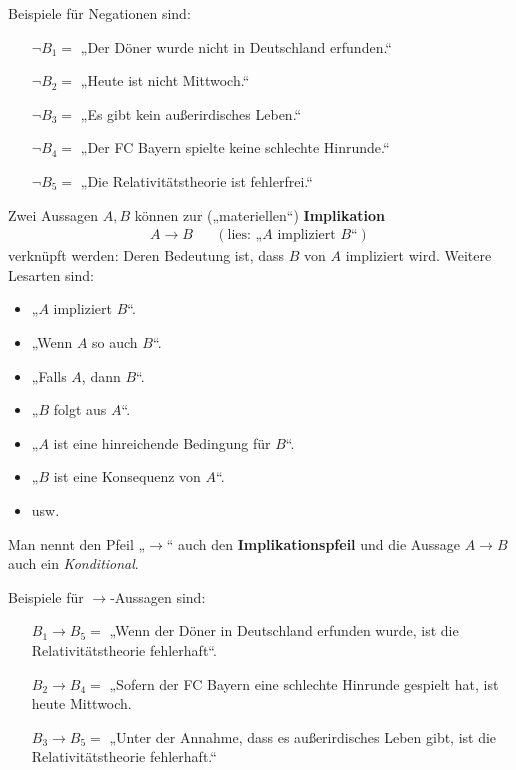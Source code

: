 \begin{bsp}    
    Beispiele für Negationen sind:
    \begin{itemize}[labelindent=1.5em, leftmargin=!, labelwidth=]
        \item[$\neg B_1 =$] „Der Döner wurde nicht in Deutschland erfunden.“
        \item[$\neg B_2 =$] „Heute ist nicht Mittwoch.“
        \item[$\neg B_3 =$] „Es gibt kein außerirdisches Leben.“
        \item[$\neg B_4 =$] „Der FC Bayern spielte keine schlechte Hinrunde.“
        \item[$\neg B_5 =$] „Die Relativitätstheorie ist fehlerfrei.“
    \end{itemize}
\end{bsp}


\begin{de}[Implikationspfeil] 
    Zwei Aussagen $A,B$ können zur („materiellen“) \textbf{Implikation}
    \begin{align*}
        A\to B   && (\text{lies: „$A$ impliziert $B$“})
    \end{align*}
    verknüpft werden: Deren Bedeutung ist, dass $B$ von $A$ impliziert wird. Weitere Lesarten sind:
    \begin{itemize}
        \item „$A$ impliziert $B$“.
        \item „Wenn $A$ so auch $B$“.
        \item „Falls $A$, dann $B$“.
        \item „$B$ folgt aus $A$“.
        \item „$A$ ist eine hinreichende Bedingung für $B$“.
        \item „$B$ ist eine Konsequenz von $A$“.
        \item usw.
    \end{itemize}
    Man nennt den Pfeil „$\to$“ auch den \textbf{Implikationspfeil} und die Aussage $A\to B$ auch ein \emph{Konditional}.
\end{de}


\begin{bsp}
    Beispiele für $\to$-Aussagen sind:
    \begin{itemize}[labelindent=1.5em, leftmargin=!, labelwidth=]
        \item[$B_1\to B_5=$] „Wenn der Döner in Deutschland erfunden wurde, ist die Relativitätstheorie fehlerhaft“.
        \item[$B_2\to B_4=$] „Sofern der FC Bayern eine schlechte Hinrunde gespielt hat, ist heute Mittwoch.
        \item[$B_3\to B_5=$] „Unter der Annahme, dass es außerirdisches Leben gibt, ist die Relativitätstheorie fehlerhaft.“
    \end{itemize}
\end{bsp}


